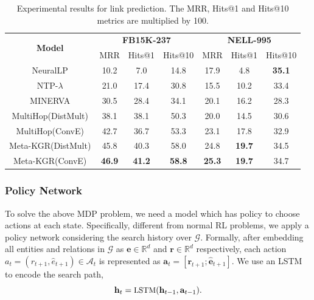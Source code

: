 \documentclass[11pt,a4paper]{article}
\begin{document}
\begin{table}[t]
\small
\centering
\setlength{\belowcaptionskip}{-1pt}
    \begin{tabular}{c|ccc|ccc}
    \toprule
    \multirow{2}{*}{\textbf{Model}} & \multicolumn{3}{c|}{\textbf{FB15K-237}} & \multicolumn{3}{c}{\textbf{NELL-995}} \\
    & MRR & Hits@1 & Hits@10 & MRR & Hits@1 & Hits@10  \\
    \midrule
    NeuralLP  & 10.2  & 7.0  & 14.8   & 17.9  & 4.8 & \textbf{35.1}  \\
    NTP-$\lambda$  & 21.0  & 17.4 & 30.8   & 15.5  & 10.2 & 33.4  \\
    MINERVA  & 30.5  & 28.4  & 34.1   & 20.1  & 16.2 & 28.3  \\
    MultiHop(DistMult)  & 38.1  & 38.1  & 50.3   & 20.0  & 14.5 & 30.6  \\
    MultiHop(ConvE)  & 42.7  & 36.7  & 53.3   & 23.1  & 17.8 & 32.9  \\
    Meta-KGR(DistMult)  & 45.8  & 40.3  & 58.0   & 24.8  & \textbf{19.7} & 34.5  \\
    Meta-KGR(ConvE)  & \textbf{46.9}  & \textbf{41.2} & \textbf{58.8}   & \textbf{25.3}  & \textbf{19.7} & 34.7  \\
    \bottomrule
    \end{tabular}
    \caption{\label{table} Experimental results for link prediction. The MRR, Hits@1 and Hits@10 metrics are multiplied by 100.}
\end{table}


\subsubsection{Policy Network}

To solve the above MDP problem, we need a model which has policy to choose actions at each state. Specifically, different from normal RL problems, we apply a policy network considering the search history over $\mathcal{G}$. Formally, after embedding all entities and relations in $\mathcal{G}$ as $\mathbf{e} \in \mathbb{R}^{d}$ and $\mathbf{r} \in \mathbb{R}^{d}$ respectively, each action $a_t = (r_{t+1}, \hat{e}_{t+1}) \in \mathcal{A}_t$ is represented as $\mathbf{a}_t = [\mathbf{r}_{t+1}; \mathbf{\hat{e}}_{t+1}]$. We use an LSTM to encode the search path,
\begin{equation}
\small
    \mathbf{h}_t = \text{LSTM} (\mathbf{h}_{t - 1}, \mathbf{a}_{t - 1}).
\end{equation}
\end{document}
